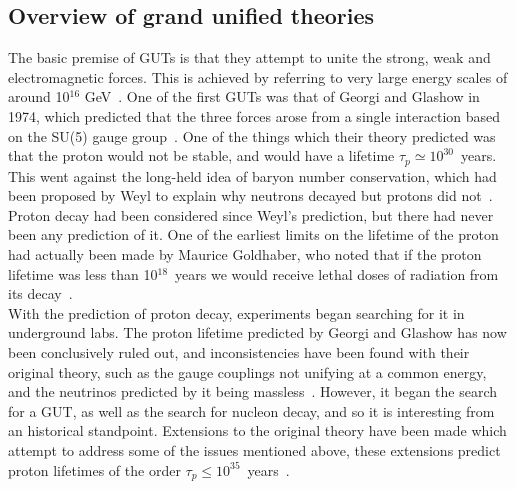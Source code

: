 \subsection{Overview of grand unified theories} \label{sec:Theory_NDK}  %
The basic premise of GUTs is that they attempt to unite the strong, weak and electromagnetic forces. This is achieved by referring to very large energy scales of around 10$^{16}$ GeV~\citep{PhysRevD.25.3092}. One of the first GUTs was that of Georgi and Glashow in 1974, which predicted that the three forces arose from a single interaction based on the SU(5) gauge group~\citep{PhysRevLett.32.438}. One of the things which their theory predicted was that the proton would not be stable, and would have a lifetime $\tau_{p} \simeq 10^{30}$~years. This went against the long-held idea of baryon number conservation, which had been proposed by Weyl to explain why neutrons decayed but protons did not~\citep{Weyl1929}. Proton decay had been considered since Weyl's prediction, but there had never been any prediction of it. One of the earliest limits on the lifetime of the proton had actually been made by Maurice Goldhaber, who noted that if the proton lifetime was less than 10$^{18}$~years we would receive lethal doses of radiation from its decay~\citep{Senjanovic:2009kr}. \\

With the prediction of proton decay, experiments began searching for it in underground labs. The proton lifetime predicted by Georgi and Glashow has now been conclusively ruled out, and inconsistencies have been found with their original theory, such as the gauge couplings not unifying at a common energy, and the neutrinos predicted by it being massless~\citep{Senjanovic:2009kr}. However, it began the search for a GUT, as well as the search for nucleon decay, and so it is interesting from an historical standpoint. Extensions to the original theory have been made which attempt to address some of the issues mentioned above, these extensions predict proton lifetimes of the order $\tau_{p} \leq 10^{35}$~years~\citep{Foot1989, Dorsner:2005fq}. \\


